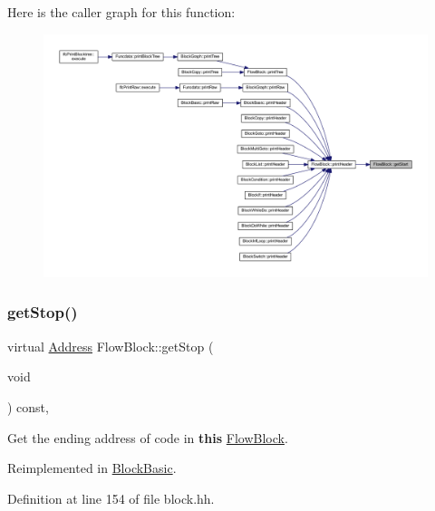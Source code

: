 Here is the caller graph for this function\+:
\nopagebreak
\begin{figure}[H]
\begin{center}
\leavevmode
\includegraphics[width=350pt]{class_flow_block_a4e2f7c4ce119ccb628c2609bc3a5b842_icgraph}
\end{center}
\end{figure}
\mbox{\label{class_flow_block_a5448927fcc62a519c92c8afcbf54e35f}} 
\subsubsection{\texorpdfstring{getStop()}{getStop()}}
{\footnotesize\ttfamily virtual \mbox{\hyperlink{class_address}{Address}} Flow\+Block\+::get\+Stop (\begin{DoxyParamCaption}\item[{void}]{ }\end{DoxyParamCaption}) const\hspace{0.3cm}{\ttfamily [inline]}, {\ttfamily [virtual]}}



Get the ending address of code in {\bfseries{this}} \mbox{\hyperlink{class_flow_block}{Flow\+Block}}. 



Reimplemented in \mbox{\hyperlink{class_block_basic_af9fb755c152296c5f3110e9dc0f51bd3}{Block\+Basic}}.



Definition at line 154 of file block.\+hh.

